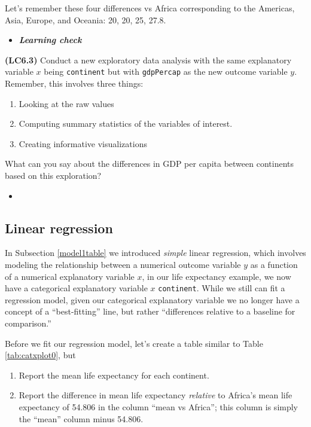 \documentclass[12pt, krantz2,]{krantz}
\providecommand{\tightlist}{%
  \setlength{\itemsep}{0pt}\setlength{\parskip}{0pt}}
\newenvironment{rmdblock}[1]
  {\begin{shaded*}
  \begin{itemize}
  \renewcommand{\labelitemi}{
    \raisebox{-.7\height}[0pt][0pt]{
    }
  }
  \item
  }
  {
  \end{itemize}
  \end{shaded*}
  }
\newenvironment{learncheck}
  {\begin{rmdblock}{warning}}
  {\end{rmdblock}}
\begin{document}
Let's remember these four differences vs Africa corresponding to the Americas, Asia, Europe, and Oceania: 20, 20, 25, 27.8.

\begin{learncheck}
\textbf{\emph{Learning check}}
\end{learncheck}

\textbf{(LC6.3)} Conduct a new exploratory data analysis with the same explanatory variable \(x\) being \texttt{continent} but with \texttt{gdpPercap} as the new outcome variable \(y\). Remember, this involves three things:

\begin{enumerate}
\def\labelenumi{\alph{enumi})}
\tightlist
\item
  Looking at the raw values
\item
  Computing summary statistics of the variables of interest.
\item
  Creating informative visualizations
\end{enumerate}

What can you say about the differences in GDP per capita between continents based on this exploration?

\begin{learncheck}

\end{learncheck}

\hypertarget{model2table}{%
\subsection{Linear regression}\label{model2table}}

In Subsection \ref{model1table} we introduced \emph{simple} linear regression, which involves modeling the relationship between a numerical outcome variable \(y\) as a function of a numerical explanatory variable \(x\), in our life expectancy example, we now have a categorical explanatory variable \(x\) \texttt{continent}. While we still can fit a regression model, given our categorical explanatory variable we no longer have a concept of a ``best-fitting'' line, but rather ``differences relative to a baseline for comparison.''

Before we fit our regression model, let's create a table similar to Table \ref{tab:catxplot0}, but

\begin{enumerate}
\def\labelenumi{\arabic{enumi}.}
\tightlist
\item
  Report the mean life expectancy for each continent.
\item
  Report the difference in mean life expectancy \emph{relative} to Africa's mean life expectancy of 54.806 in the column ``mean vs Africa''; this column is simply the ``mean'' column minus 54.806.
\end{enumerate}
\end{document}
